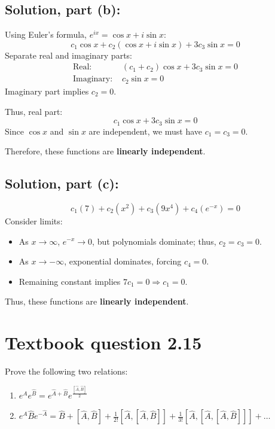 \documentclass[12pt]{article}
\begin{document}
    \subsection{Solution, part (b):} 
        Using Euler's formula, $e^{ix} = \cos x + i\sin x$:
        \[
        c_1\cos x + c_2(\cos x + i\sin x) + 3 c_3\sin x = 0
        \]
        Separate real and imaginary parts:
        \begin{align*}
        \text{Real: } & (c_1 + c_2)\cos x + 3 c_3\sin x = 0 \\
        \text{Imaginary: } & c_2\sin x = 0
        \end{align*}
        Imaginary part implies $c_2 = 0$.
        
        Thus, real part:
        \[
        c_1\cos x + 3 c_3\sin x = 0
        \]
        Since $\cos x$ and $\sin x$ are independent, we must have $c_1 = c_3 = 0$.
        
        Therefore, these functions are \textbf{linearly independent}.

    \subsection{Solution, part (c):}  
        \[
        c_1(7) + c_2(x^2) + c_3(9x^4) + c_4(e^{-x}) = 0
        \]
        Consider limits:
        \begin{itemize}
        \item As $x \to \infty$, $e^{-x} \to 0$, but polynomials dominate; thus, $c_2 = c_3 = 0$.
        \item As $x \to -\infty$, exponential dominates, forcing $c_4 = 0$.
        \item Remaining constant implies $7 c_1 = 0 \Rightarrow c_1 = 0$.
        \end{itemize}
        Thus, these functions are \textbf{linearly independent}.
         
\section*{Textbook question 2.15}
  Prove the following two relations:
  \begin{enumerate}
      \item [(a)] $e^{\hat{A}} e^{\hat{B}} = e^{\hat{A}+\hat{B}} e^{\frac{[\hat{A},\hat{B}]}{2}}$
      \item [(b)] $e^{\hat{A}} \hat{B} e^{-\hat{A}} = \hat{B} + [\hat{A}, \hat{B}] + \frac{1}{2!} [\hat{A}, [\hat{A}, \hat{B}]] + \frac{1}{3!} [\hat{A}, [\hat{A}, [\hat{A}, \hat{B}]]] + \dots$
  \end{enumerate}
  
\end{document}
